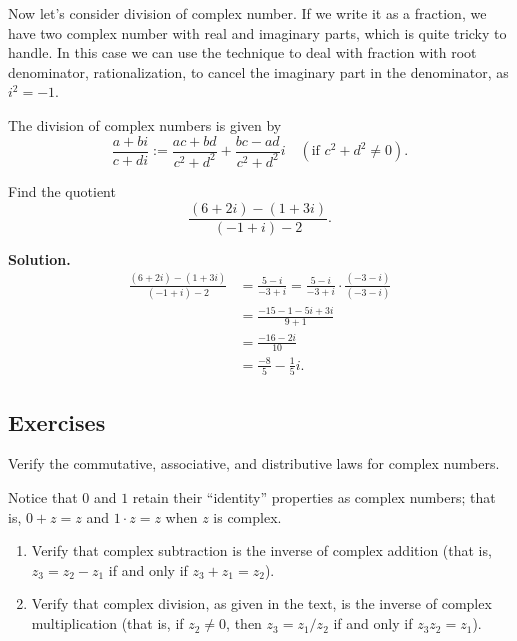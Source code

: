 Now let's consider division of complex number. If we write it as a fraction, we have two complex number with real and imaginary parts, which is quite tricky to handle.
In this case we can use the technique to deal with fraction with root denominator, rationalization, to cancel the imaginary part in the denominator, as $i^2=-1$.
\begin{definition}
    The division of complex numbers is given by
\[
\frac{a + bi}{c + di} := \frac{ac + bd}{c^2 + d^2} + \frac{bc - ad}{c^2 + d^2}i \quad (\text{if } c^2 + d^2 \neq 0).
\]
\end{definition}

\begin{example}
    Find the quotient
\[
\frac{(6 + 2i) - (1 + 3i)}{(-1 + i) - 2}.
\]
\end{example}
\textbf{Solution.}
\begin{align*}
\frac{(6 + 2i) - (1 + 3i)}{(-1 + i) - 2} &= \frac{5 - i}{-3 + i} = \frac{5 - i}{-3 + i} \cdot \frac{(-3 - i)}{(-3 - i)} \\
&= \frac{-15 - 1 - 5i + 3i}{9 + 1} \\
&= \frac{-16 - 2i}{10} \\
&= \frac{-8}{5} - \frac{1}{5}i. 
\end{align*}

\subsection{Exercises}
\begin{exercise}
    Verify the commutative, associative, and distributive laws for complex numbers.
\end{exercise}

\begin{exercise}
    Notice that \(0\) and \(1\) retain their “identity” properties as complex numbers; that is, \(0 + z = z\) and \(1 \cdot z = z\) when \(z\) is complex.
    \begin{enumerate}[label=(\alph*)]
        \item Verify that complex subtraction is the inverse of complex addition (that is, \(z_3 = z_2 - z_1\) if and only if \(z_3 + z_1 = z_2\)).
        \item Verify that complex division, as given in the text, is the inverse of complex multiplication (that is, if \(z_2 \neq 0\), then \(z_3 = z_1 / z_2\) if and only if \(z_3z_2 = z_1\)).
    \end{enumerate}
    \end{exercise}

